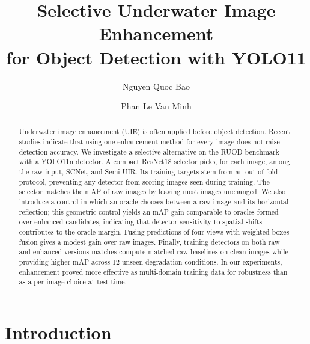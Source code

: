 \documentclass[runningheads]{llncs}
\begin{document}
\title{Selective Underwater Image Enhancement\\for Object Detection with YOLO11}

\author{Nguyen Quoc Bao \and Phan Le Van Minh}


\maketitle

\begin{abstract}
    Underwater image enhancement (UIE) is often applied before object detection. Recent studies indicate that using one enhancement method for every image does not raise detection accuracy. We investigate a selective alternative on the RUOD benchmark with a YOLO11n detector. A compact ResNet18 selector picks, for each image, among the raw input, SCNet, and Semi-UIR. Its training targets stem from an out-of-fold protocol, preventing any detector from scoring images seen during training. The selector matches the mAP of raw images by leaving most images unchanged. We also introduce a control in which an oracle chooses between a raw image and its horizontal reflection; this geometric control yields an mAP gain comparable to oracles formed over enhanced candidates, indicating that detector sensitivity to spatial shifts contributes to the oracle margin. Fusing predictions of four views with weighted boxes fusion gives a modest gain over raw images. Finally, training detectors on both raw and enhanced versions matches compute-matched raw baselines on clean images while providing higher mAP across 12 unseen degradation conditions. In our experiments, enhancement proved more effective as multi-domain training data for robustness than as a per-image choice at test time.

\end{abstract}

\section{Introduction}
\label{sec:intro}
\end{document}

